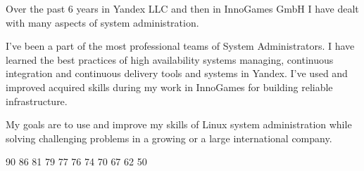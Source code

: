 \documentclass[11pt]{developercv} %
\begin{document}
\vspace{1.5cm}



\begin{minipage}[t]{0.48\textwidth} %
  \parindent=2mm
  Over the past 6 years in Yandex LLC and then in InnoGames GmbH I have dealt with many aspects of system administration.

  I've been a part of the most professional teams of System Administrators. I have learned the best practices of high availability systems managing, continuous integration and continuous delivery tools and systems in Yandex. I've used and improved acquired skills during my work in InnoGames for building reliable infrastructure.

  My goals are to use and improve my skills of Linux system administration while solving challenging problems in a growing or a large international company.
\end{minipage}
\hfill %
\begin{minipage}[t]{0.5\textwidth} %
  \vspace{-\baselineskip} %
  \small
  \begin{barchart}{5}
                  {90}
         {86}
                  {81}
     {79}
                     {77}
                  {76}
                    {74}
                   {70}
                 {67}
                  {62}
               {50}
  \end{barchart}
\end{minipage}

\begin{center}
\end{center}

\vspace{1.5cm}
\end{document}
